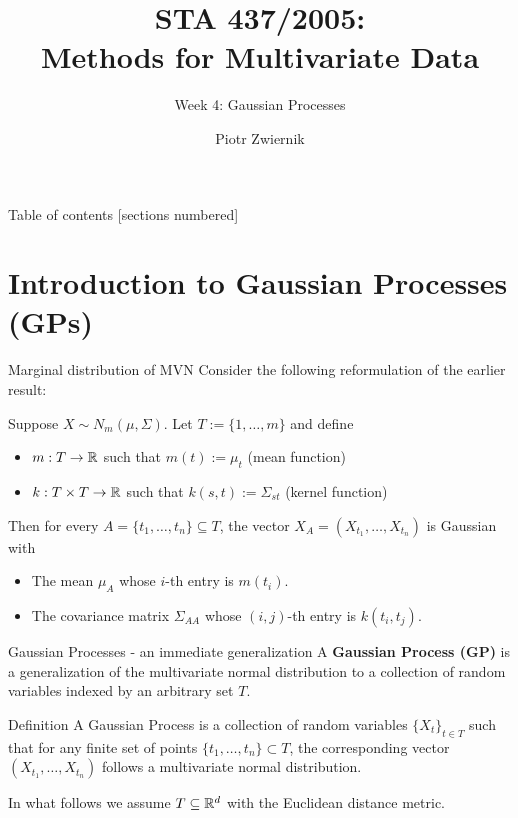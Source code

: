 \documentclass[11pt,handout,aspectratio=169]{beamer}
\title[STA437-Week1]{STA 437/2005: \\ Methods for Multivariate Data}
\subtitle[]{Week 4: Gaussian Processes}
\author[Piotr Zwiernik]{Piotr Zwiernik}
\institute[UofT]{University of Toronto}
\date{}
\begin{document}
\maketitle

\begin{frame}{Table of contents}
[sections numbered]
\tableofcontents%
\end{frame}

\section{Introduction to Gaussian Processes (GPs)}

\begin{frame}{Marginal distribution of MVN}
Consider the following reformulation of the earlier result:

Suppose $X\sim N_m(\mu,\Sigma)$. Let \alert{$T:=\{1,\ldots,m\}$} and define
\begin{itemize}
	\item  $m:T \to \mathbb R$ such that $m(t):=\mu_t$ (mean function)
	\item $k:T\times T\to \mathbb R$ such that $k(s,t):=\Sigma_{st}$ (kernel function)
\end{itemize}

Then for every $A=\{t_1,\ldots,t_n\}\subseteq T$, the vector $X_A=(X_{t_1},\ldots,X_{t_n})$ is Gaussian with
\begin{itemize}
	\item The mean $\mu_A$ whose $i$-th entry is $m(t_i)$.
	\item The covariance matrix $\Sigma_{AA}$ whose $(i,j)$-th entry is $k(t_i,t_j)$.
\end{itemize} 
\end{frame}

\begin{frame}{Gaussian Processes - an immediate generalization}
A \textbf{Gaussian Process (GP)} is a generalization of the multivariate normal distribution to a collection of random variables indexed by an \alert{arbitrary} set \( T \).

\begin{alertblock}{Definition}
A Gaussian Process is a collection of random variables $\{X_t\}_{t\in T}$ such that for any finite set of points \( \{t_1, \dots, t_n\} \subset T \), the corresponding vector \( (X_{t_1}, \dots, X_{t_n}) \) follows a multivariate normal distribution.
\end{alertblock}

In what follows we assume $T\subseteq \mathbb R^d$ with the Euclidean distance metric.
\end{frame}
\end{document}
